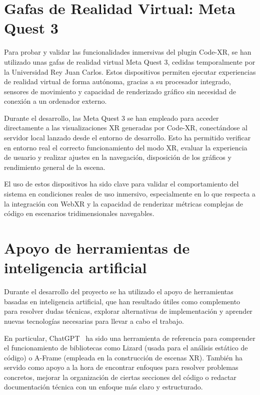 \documentclass[a4paper, 12pt]{book}
\begin{document}
\section{Gafas de Realidad Virtual: Meta Quest 3}
\label{sec:meta-quest-3}

Para probar y validar las funcionalidades inmersivas del plugin Code-XR, se han utilizado unas gafas de realidad virtual Meta Quest 3, cedidas temporalmente por la Universidad Rey Juan Carlos. Estos dispositivos permiten ejecutar experiencias de realidad virtual de forma autónoma, gracias a su procesador integrado, sensores de movimiento y capacidad de renderizado gráfico sin necesidad de conexión a un ordenador externo.

Durante el desarrollo, las Meta Quest 3 se han empleado para acceder directamente a las visualizaciones XR generadas por Code-XR, conectándose al servidor local lanzado desde el entorno de desarrollo. Esto ha permitido verificar en entorno real el correcto funcionamiento del modo XR, evaluar la experiencia de usuario y realizar ajustes en la navegación, disposición de los gráficos y rendimiento general de la escena.

El uso de estos dispositivos ha sido clave para validar el comportamiento del sistema en condiciones reales de uso inmersivo, especialmente en lo que respecta a la integración con WebXR y la capacidad de renderizar métricas complejas de código en escenarios tridimensionales navegables.


\section{Apoyo de herramientas de inteligencia artificial}
\label{sec:ia}

Durante el desarrollo del proyecto se ha utilizado el apoyo de herramientas basadas en inteligencia artificial, que han resultado útiles como complemento para resolver dudas técnicas, explorar alternativas de implementación y aprender nuevas tecnologías necesarias para llevar a cabo el trabajo.

En particular, ChatGPT~\cite{chatgpt} ha sido una herramienta de referencia para comprender el funcionamiento de bibliotecas como Lizard (usada para el análisis estático de código) o A-Frame (empleada en la construcción de escenas XR). También ha servido como apoyo a la hora de encontrar enfoques para resolver problemas concretos, mejorar la organización de ciertas secciones del código o redactar documentación técnica con un enfoque más claro y estructurado.
\end{document}
